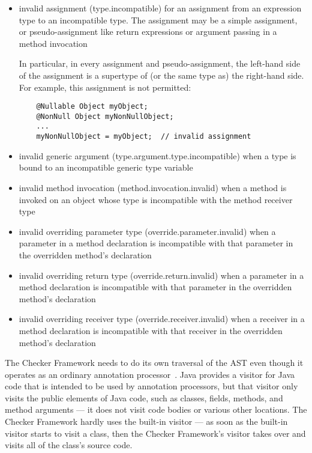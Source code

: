 \begin{itemize}

\item invalid assignment (type.incompatible) for an assignment from
  an expression type to an incompatible type.  The assignment may be a
  simple assignment, or pseudo-assignment like return expressions or
  argument passing in a method invocation

  In particular, in every assignment and pseudo-assignment, the
  left-hand side of the assignment is a supertype of (or the same type
  as) the right-hand side.  For example, this assignment is not
  permitted:

  \begin{Verbatim}
    @Nullable Object myObject;
    @NonNull Object myNonNullObject;
    ...
    myNonNullObject = myObject;  // invalid assignment
  \end{Verbatim}

\item invalid generic argument (type.argument.type.incompatible) when a type
  is bound to an incompatible generic type variable

\item invalid method invocation (method.invocation.invalid) when a
  method is invoked on an object whose type is incompatible with the
  method receiver type

\item invalid overriding parameter type (override.parameter.invalid)
  when a parameter in a method declaration is incompatible with that
  parameter in the overridden method's declaration

\item invalid overriding return type (override.return.invalid) when a
  parameter in a method declaration is incompatible with that
  parameter in the overridden method's declaration

\item invalid overriding receiver type (override.receiver.invalid)
  when a receiver in a method declaration is incompatible with that
  receiver in the overridden method's declaration

\end{itemize}



The Checker Framework needs to do its own traversal of the AST even though
it operates as an ordinary annotation processor~\cite{JSR269}.  Java
provides a visitor for Java code that is intended to be used by annotation
processors, but that visitor only
visits the public elements of Java code, such as classes, fields, methods,
and method arguments --- it does not visit code bodies or various other
locations.  The Checker Framework hardly uses the built-in visitor --- as
soon as the built-in visitor starts to visit a class, then the Checker
Framework's visitor takes over and visits all of the class's source code.

